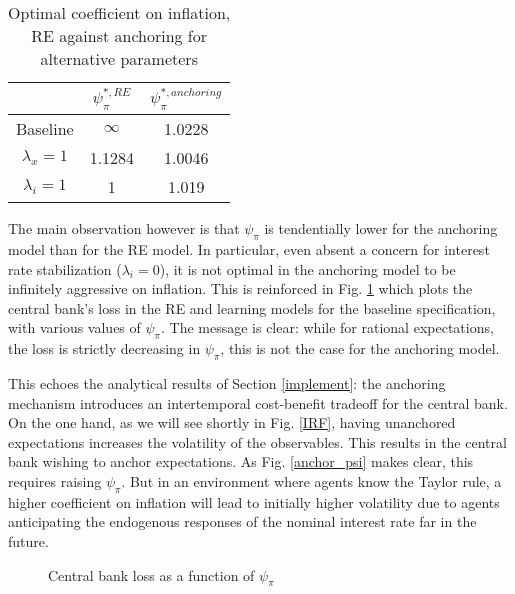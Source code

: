\documentclass[11pt]{article}
\def \myFigPath {../../figures/}
\renewcommand{\[}{\begin{equation}}
\renewcommand{\]}{\end{equation}}
\def\fignameCBlossRE{plot_sim_loss_pretty_loss_RE_again_critCUSUM_constant_only_params_psi_pi_1_5_psi_x_0_gbar_0_145_thetbar_16_thettilde_2_5_kap_0_8_lamx_0_lami_0_2020_06_05}
\def\fignameCBlossAnch{plot_sim_loss_pretty_loss_again_critCUSUM_constant_only_T_400_N_100_burnin_0_params_psi_pi_1_5_psi_x_0_gbar_0_145_thetbar_16_thettilde_2_5_kap_0_8_lamx_0_lami_0_date_2020_06_05}
\begin{document}
\begin{center}
\begin{table}[h!]
\begin{tabular}{ c | c | c }
 & $\psi^{*,RE}_{\pi}$ & $\psi^{*,anchoring}_{\pi}$  \\  \hline
  Baseline  & $\infty$  & 1.0228 \\  \hline
 $\lambda_x =1 $ & 1.1284  & 1.0046 \\  \hline
 $\lambda_i =1 $ &  1  & 1.019 \\  \hline
\end{tabular}     
      \caption{Optimal coefficient on inflation, RE against anchoring for alternative parameters}  \label{par_opt}
 \end{table}
\end{center}


\vspace{-0.8cm}

The main observation however is that $\psi_{\pi}$ is tendentially lower for the anchoring model than for the RE model. In particular, even absent a concern for interest rate stabilization ($\lambda_i = 0$), it is not optimal in the anchoring model to be infinitely aggressive on inflation. This is reinforced in Fig. \ref{fig_loss} which plots the central bank's loss in the RE and learning models for the baseline specification, with various values of $\psi_{\pi}$. The message is clear: while for rational expectations, the loss is strictly decreasing in $\psi_{\pi}$, this is not the case for the anchoring model. 

This echoes the analytical results of Section \ref{implement}: the anchoring mechanism introduces an intertemporal cost-benefit tradeoff for the central bank. On the one hand, as we will see shortly in Fig. \ref{IRF}, having unanchored expectations increases the volatility of the observables. This results in the central bank wishing to anchor expectations. As Fig. \ref{anchor_psi} makes clear, this requires raising $\psi_{\pi}$. But in an environment where agents know the Taylor rule, a higher coefficient on inflation will lead to initially higher volatility due to agents anticipating the endogenous responses of the nominal interest rate far in the future.


\begin{figure}[h!]
\caption{Central bank loss as a function of $\psi_{\pi}$}
\label{fig_loss}
\end{figure}
\end{document}

